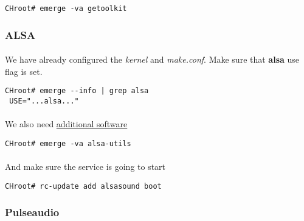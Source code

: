 \documentclass[10pt,a4paper]{article}
\begin{document}
                    \begin{lstlisting}[style=BashInputCHRoot]
 CHroot# emerge -va getoolkit
                    \end{lstlisting}
                    
                \newpage
                \subsubsection{ALSA}
                
                    \paragraph{} We have already configured the \textit{kernel} and \textit{make.conf}. Make sure that \textbf{alsa} use flag is set.
                    
                    \begin{lstlisting}[style=BashInputCHRoot]
 CHroot# emerge --info | grep alsa
 USE="...alsa..."
                    \end{lstlisting}
                    
                    \paragraph{} We also need \href{https://wiki.gentoo.org/wiki/ALSA#Software}{additional software}
                    
                    \begin{lstlisting}[style=BashInputCHRoot]
 CHroot# emerge -va alsa-utils
                    \end{lstlisting}
                    
                    \paragraph{} And make sure the service is going to start
                    
                    \begin{lstlisting}[style=BashInputCHRoot]
 CHroot# rc-update add alsasound boot
                    \end{lstlisting}
                    
                \newpage
                \subsubsection{Pulseaudio}
                
\end{document}
